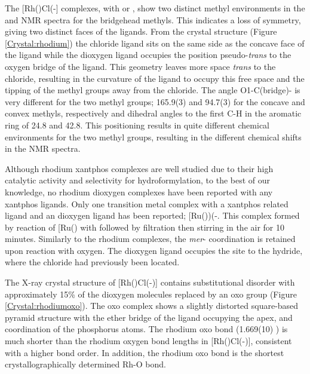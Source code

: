 The [Rh(\tBuxantphos)Cl(-] complexes, with \tBusixantphos{} or \tBuxantphos{}, show two distinct methyl environments in the \proton{} and \carbon{} NMR spectra for the bridgehead methyls.  This indicates a loss of symmetry, giving two distinct faces of the \tBuxantphos{} ligands.  From the crystal structure (Figure \ref{Crystal:rhodium}) the chloride ligand sits on the same side as the concave face of the ligand while the dioxygen ligand occupies the position pseudo-\emph{trans} to the oxygen bridge of the ligand.  This geometry leaves more space \emph{trans} to the chloride, resulting in the curvature of the ligand to occupy this free space and the tipping of the methyl groups away from the chloride.  The angle O1-C(bridge)- is very different for the two methyl groups; 165.9(3) and 94.7(3)\degrees{} for the concave and convex methyls, respectively and dihedral angles to the first C-H in the aromatic ring of 24.8 and 42.8\degrees.  This positioning results in quite different chemical environments for the two methyl groups, resulting in the different chemical shifts in the NMR spectra.  

Although rhodium xantphos{} complexes are well studied due to their high catalytic activity and selectivity for hydroformylation, to the best of our knowledge, no rhodium dioxygen complexes have been reported with any xantphos ligands.  Only one transition metal complex with a xantphos related ligand and an  dioxygen ligand has been reported; [Ru(\Phxantphos))(-\ce{O2)H]BAr4^F}.\cite{Ledger2010}  This complex formed by reaction of [Ru(\Phxantphos)\ce{(PPh3)HCl]} with  followed by filtration then stirring in the air for 10 minutes.  Similarly to the rhodium \tBuxantphos{} complexes, the \emph{mer}-\POP{} coordination is retained upon reaction with oxygen.  The dioxygen ligand occupies the site \trans{} to the hydride, where the chloride had previously been located.  

The X-ray crystal structure of [Rh(\tBuxantphos)Cl(-)] contains substitutional disorder with approximately 15\%{} of the dioxygen molecules replaced by an oxo group (Figure \ref{Crystal:rhodiumoxo}).  The oxo complex shows a slightly distorted square-based pyramid structure with the ether bridge of the \tBuxantphos{} ligand occupying the apex, and \trans{} coordination of the phosphorus atoms.  The rhodium oxo bond (1.669(10) \A) is much shorter than the rhodium oxygen bond lengths in [Rh(\tBuxantphos)Cl(-)], consistent with a higher bond order.  In addition, the rhodium oxo bond is the shortest crystallographically determined Rh-O bond.  

